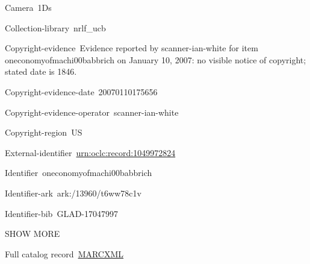 \documentclass{article}
\begin{document}
Camera 1Ds


Collection-library nrlf\_ucb


Copyright-evidence Evidence reported by scanner-ian-white for item oneconomyofmachi00babbrich on January 10, 2007: no visible notice of copyright; stated date is 1846.


Copyright-evidence-date 20070110175656


Copyright-evidence-operator scanner-ian-white


Copyright-region US


External-identifier \href{https://archive.org/search.php?query=external-identifier%3A%22urn%3Aoclc%3Arecord%3A1049972824%22}{urn:oclc:record:1049972824}


Identifier oneconomyofmachi00babbrich


Identifier-ark ark:/13960/t6ww78c1v


Identifier-bib GLAD-17047997


SHOW MORE


Full catalog record \href{https://archive.org/download/oneconomyofmachi00babbrich/oneconomyofmachi00babbrich_archive_marc.xml}{MARCXML}
\end{document}
